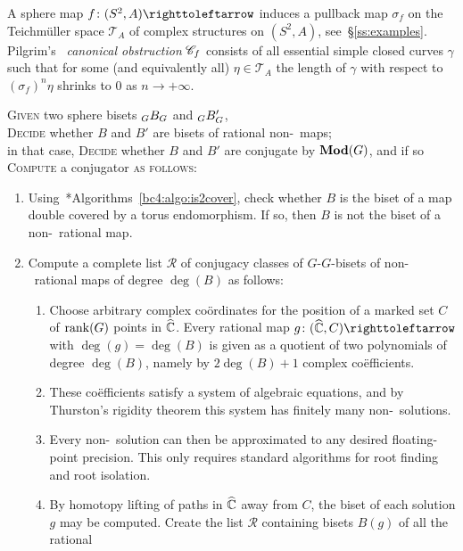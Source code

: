 \documentclass{amsart}
\begin{document}
A sphere map $f\colon (S^2,A)\selfmap$ induces a pullback map
$\sigma_f$ on the Teichm\"uller space $\mathscr T_A$ of complex
structures on $(S^2,A)$,
see~\S\ref{ss:examples}. Pilgrim's~\cite{pilgrim:combinations}
\emph{canonical obstruction} ${\mathscr C}_f$ consists of all essential simple
closed curves $\gamma$ such that for some (and equivalently all)
$\eta\in \mathscr T_A$ the length of $\gamma$ with respect to
$(\sigma_f)^n\eta$ shrinks to $0$ as $n\to +\infty$.

\begin{algo}\label{algo:ratmaps}
  \textsc{Given} two sphere bisets $\subscript{ G }B_G$ and $\subscript{ G }B'_G$,\\
  \textsc{Decide} whether $B$ and $B'$ are bisets of rational non-\Tor~maps;\\
  in that case, \textsc{Decide} whether $B$ and $B'$ are conjugate by $\mathbf{\relax Mod}(G)$, and if so \textsc{Compute} a conjugator \textsc{ as follows:}\\
  \begin{enumerate}
  \item
    Using~\cite{bartholdi-dudko:bc4}*{Algorithms~\ref{bc4:algo:is2cover}},
    check whether $B$ is the biset of a map double covered by a torus
    endomorphism. If so, then $B$ is not the biset of a non-\Tor\
    rational map.
  \item Compute a complete list $\mathscr R$ of conjugacy classes of
    $G$-$G$-bisets of non-\Tor\ rational maps of degree $\deg(B)$ as
    follows:
    \begin{enumerate}
    \item Choose arbitrary complex co\"ordinates for the position of a
      marked set $C$ of ${\operatorname{rank}} (G)$ points in ${\widehat{{\mathbb C}}}$. Every rational
      map $g\colon(\hC,C)\selfmap$ with $\deg(g)=\deg(B)$ is given as
      a quotient of two polynomials of degree $\deg(B)$, namely by
      $2\deg(B)+1$ complex co\"efficients.
    \item These co\"efficients satisfy a system of algebraic
      equations, and by Thurston's rigidity theorem this system has
      finitely many non-\Tor\ solutions.
    \item Every non-\Tor\ solution can then be approximated to any
      desired floating-point precision. This only requires standard
      algorithms for root finding and root isolation.
    \item By homotopy lifting of paths in ${\widehat{{\mathbb C}}}$ away from $C$, the
      biset of each solution $g$ may be computed. Create the list
      $\mathscr R$ containing bisets $B(g)$ of all the rational

\end{enumerate}
\end{enumerate}
\end{algo}
\end{document}
